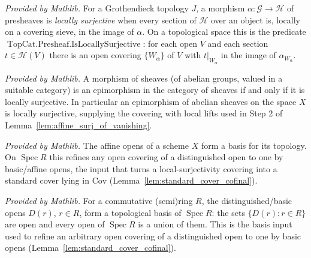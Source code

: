 \begin{lemma}
  \label{lem:presheaf_is_locally_surjective}
  \mathlibok
  \textit{Provided by Mathlib.}
  For a Grothendieck topology \(J\), a morphism \(\alpha : \mathcal{G} \to \mathcal{H}\) of presheaves
  is \emph{locally surjective} when every section of \(\mathcal{H}\) over an object is, locally on a
  covering sieve, in the image of \(\alpha\). On a topological space this is the predicate
  \(\operatorname{TopCat.Presheaf.IsLocallySurjective}\): for each open \(V\) and each section
  \(t \in \mathcal{H}(V)\) there is an open covering \(\{W_\alpha\}\) of \(V\) with \(t|_{W_\alpha}\)
  in the image of \(\alpha_{W_\alpha}\).
\end{lemma}

\begin{lemma}
  \label{lem:sheaf_locally_surjective_iff_epi}
  \mathlibok
  \textit{Provided by Mathlib.}
  A morphism of sheaves (of abelian groups, valued in a suitable category) is an epimorphism in the
  category of sheaves if and only if it is locally surjective. In particular an epimorphism of
  abelian sheaves on the space \(X\) is locally surjective, supplying the covering with local lifts
  used in Step 2 of Lemma~\ref{lem:affine_surj_of_vanishing}.
\end{lemma}

\begin{lemma}
  \label{lem:scheme_isBasis_affineOpens}
  \mathlibok
  \textit{Provided by Mathlib.}
  The affine opens of a scheme \(X\) form a basis for its topology. On \(\operatorname{Spec} R\) this
  refines any open covering of a distinguished open to one by basic/affine opens, the input that
  turns a local-surjectivity covering into a standard cover lying in \(\mathrm{Cov}\)
  (Lemma~\ref{lem:standard_cover_cofinal}).
\end{lemma}

\begin{lemma}
  \label{lem:primeSpectrum_isBasis_basicOpen}
  \mathlibok
  \textit{Provided by Mathlib.}
  For a commutative (semi)ring \(R\), the distinguished/basic opens \(D(r)\), \(r \in R\), form a
  topological basis of \(\operatorname{Spec} R\): the sets \(\{D(r) : r \in R\}\) are open and every
  open of \(\operatorname{Spec} R\) is a union of them. This is the basis input used to refine an
  arbitrary open covering of a distinguished open to one by basic opens
  (Lemma~\ref{lem:standard_cover_cofinal}).
\end{lemma}

